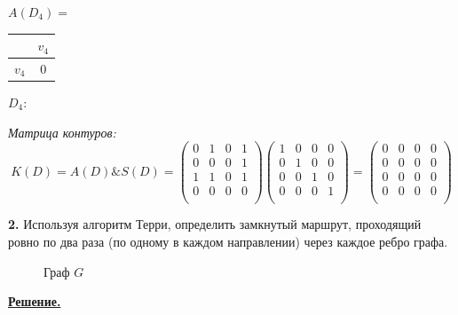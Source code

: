 \documentclass[12pt, letterpaper, titlepage]{article}
\begin{document}
$A(D_4)=$
\begin{tabular}{|c|c|}
    \hline
            & $v_{4}$ \\
    \hline
    $v_{4}$ & 0       \\
    \hline
\end{tabular}\hspace{1cm}$D_4:$\hspace{1cm}


\emph{Матрица контуров:}
\begin{equation*}
    K(D)=A(D) \& S(D) =
    \begin{pmatrix}
        0 & 1 & 0 & 1 \\
        0 & 0 & 0 & 1 \\
        1 & 1 & 0 & 1 \\
        0 & 0 & 0 & 0 \\
    \end{pmatrix}
    \begin{pmatrix}
        1 & 0 & 0 & 0 \\
        0 & 1 & 0 & 0 \\
        0 & 0 & 1 & 0 \\
        0 & 0 & 0 & 1 \\
    \end{pmatrix}
    =
    \begin{pmatrix}
        0 & 0 & 0 & 0 \\
        0 & 0 & 0 & 0 \\
        0 & 0 & 0 & 0 \\
        0 & 0 & 0 & 0 \\
    \end{pmatrix}
\end{equation*}

\textbf{2.} Используя алгоритм Терри, определить замкнутый маршрут, проходящий ровно по два раза
(по одному в каждом направлении) через каждое ребро графа.
\begin{figure}[H]\centering\caption{Граф $G$}\end{figure}
\underline{\textbf{Решение.}}
\end{document}
